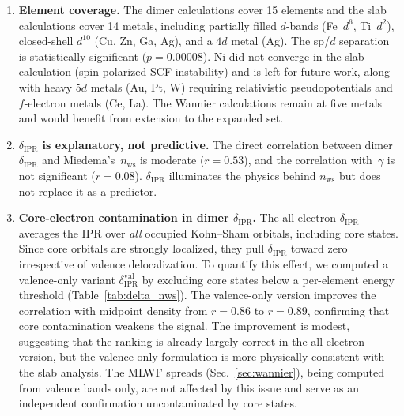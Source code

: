 \documentclass[twocolumn,showpacs,preprintnumbers,amsmath,amssymb,prb]{revtex4-2}
\begin{document}
\begin{enumerate}
  \item \textbf{Element coverage.}
    The dimer calculations cover 15 elements and the slab
    calculations cover 14 metals, including partially filled
    $d$-bands (Fe~$d^6$, Ti~$d^2$), closed-shell $d^{10}$
    (Cu, Zn, Ga, Ag), and a $4d$ metal (Ag).
    The sp/$d$ separation is statistically significant
    ($p = 0.00008$).
    Ni did not converge in the slab calculation (spin-polarized
    SCF instability) and is left for future work, along with
    heavy $5d$ metals (Au, Pt, W) requiring relativistic
    pseudopotentials and $f$-electron metals (Ce, La).
    The Wannier calculations remain at five metals and would
    benefit from extension to the expanded set.

  \item \textbf{$\delta_\mathrm{IPR}$ is explanatory, not predictive.}
    The direct correlation between dimer $\delta_\mathrm{IPR}$
    and Miedema's~$n_\mathrm{ws}$ is moderate ($r = 0.53$),
    and the correlation with~$\gamma$ is not significant
    ($r = 0.08$).
    $\delta_\mathrm{IPR}$ illuminates the physics behind
    $n_\mathrm{ws}$ but does not replace it as a predictor.

  \item \textbf{Core-electron contamination in dimer $\delta_\mathrm{IPR}$.}
    The all-electron $\delta_\mathrm{IPR}$ averages the IPR over
    \emph{all} occupied Kohn--Sham orbitals, including core states.
    Since core orbitals are strongly localized, they pull
    $\delta_\mathrm{IPR}$ toward zero irrespective of valence
    delocalization. To quantify this effect, we computed a valence-only
    variant $\delta_\mathrm{IPR}^\mathrm{val}$ by excluding core states
    below a per-element energy threshold (Table~\ref{tab:delta_nws}).
    The valence-only version improves the correlation with midpoint
    density from $r = 0.86$ to $r = 0.89$, confirming that core
    contamination weakens the signal.
    The improvement is modest, suggesting that the ranking is already
    largely correct in the all-electron version, but the valence-only
    formulation is more physically consistent with the slab analysis.
    The MLWF spreads (Sec.~\ref{sec:wannier}), being computed from
    valence bands only, are not affected by this issue and serve as
    an independent confirmation uncontaminated by core states.


\end{enumerate}
\end{document}
